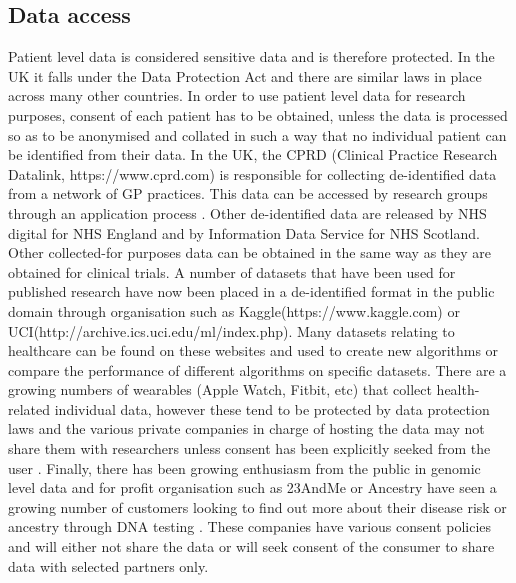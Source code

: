 \subsection{Data access}
Patient level data is considered sensitive data and is therefore protected. In the UK it falls under the Data Protection Act \citep{Anonymous:YZCGtNyR}  and there are similar laws in place across many other countries.\newline
In order to use patient level data for research purposes, consent of each patient has to be obtained, unless the data is processed so as to be anonymised and collated in such a way that no individual patient can be  identified from their data. In the UK, the CPRD (Clinical Practice Research Datalink, https://www.cprd.com) is responsible for collecting de-identified data from a network of GP practices. This data can be accessed by research groups through an application process \citep{CPRD:VYxcqU74}. Other de-identified data are released by NHS digital for NHS England and by Information Data Service for NHS Scotland.
Other collected-for purposes data can be obtained in the same way as they are obtained for clinical trials. A number of datasets that have been used for published research have now been placed in a de-identified format in the public domain through organisation such as Kaggle(https://www.kaggle.com) or UCI(http://archive.ics.uci.edu/ml/index.php). Many datasets relating to healthcare can be found on these websites and used to create new algorithms or compare the performance of different algorithms on specific datasets.\newline
There are a growing numbers of wearables (Apple Watch, Fitbit, etc) that collect health-related individual data, however these tend to be protected by data protection laws and the various private companies in charge of hosting the data may not share them with researchers unless consent has been explicitly seeked from the user \citep{Apple:nN4TDuuN, Fitbit:FvPrmdk3}. Finally, there has been growing enthusiasm from the public in genomic level data and for profit organisation such as 23AndMe or Ancestry have seen a growing number of customers looking to find out more about their disease risk or ancestry through DNA testing \citep{Regalado:vf}. These companies have various consent policies and will either not share the data or will seek consent of the consumer to share data with selected partners only. 


